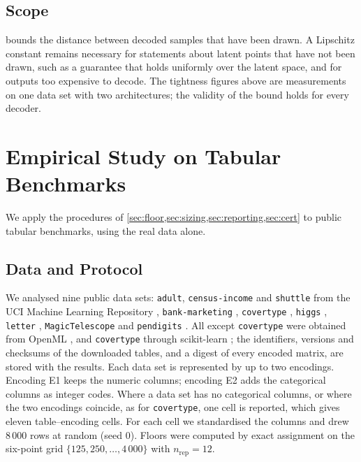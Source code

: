 \documentclass[twoside,11pt]{article}
\theoremstyle{plain}
\theoremstyle{definition}
\theoremstyle{remark}
\begin{document}
\subsection{Scope}\label{sec:pullback-scope}

 bounds the distance between decoded samples that have been
drawn. A Lipschitz constant remains necessary for statements about latent
points that have not been drawn, such as a guarantee that holds uniformly
over the latent space, and for outputs too expensive to decode. The
tightness figures above are measurements on one data set with two
architectures; the validity of the bound holds for every decoder.

\section{Empirical Study on Tabular Benchmarks}\label{sec:empirical}

We apply the procedures of \cref{sec:floor,sec:sizing,sec:reporting,sec:cert}
to public tabular benchmarks, using the real data alone.

\subsection{Data and Protocol}\label{sec:empirical-design}

We analysed nine public data sets: \texttt{adult},
\texttt{census-income} and \texttt{shuttle} from the UCI Machine Learning
Repository \citep{kelly2026}, \texttt{bank-marketing} \citep{moro2014},
\texttt{covertype} \citep{blackard1999}, \texttt{higgs} \citep{baldi2014},
\texttt{letter} \citep{frey1991}, \texttt{MagicTelescope}
\citep{bock2004} and \texttt{pendigits} \citep{alimoglu1997}. All except
\texttt{covertype} were obtained from OpenML \citep{vanschoren2014}, and
\texttt{covertype} through scikit-learn \citep{pedregosa2011}; the
identifiers, versions and checksums of the downloaded tables, and a digest
of every encoded matrix, are stored with the results. Each data set is
represented by up to two encodings. Encoding E1
keeps the numeric columns; encoding E2 adds the categorical columns as
integer codes. Where a data set has no categorical columns, or where the two
encodings coincide, as for \texttt{covertype}, one cell is reported, which
gives eleven table--encoding cells. For each cell we standardised the
columns and drew $8\,000$ rows at random (seed $0$). Floors were computed by
exact assignment on the six-point grid $\{125, 250, \dots, 4\,000\}$ with
$n_{\mathrm{rep}} = 12$.
\end{document}
